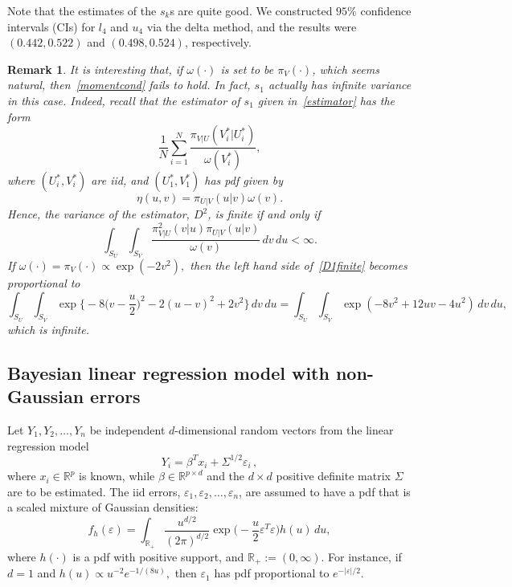 \documentclass[11pt]{article}
\newtheorem{remark}{Remark}
\begin{document}
         Note that the estimates of the $s_k$s are quite good.  We
         constructed $95\%$ confidence intervals (CIs) for $l_4$ and
         $u_4$ via the delta method, and the results were
         $(0.442,0.522)$ and $(0.498,0.524)$, respectively.

         \begin{remark} \label{gaussianomegapi} It is interesting
           that, if $\omega(\cdot)$ is set to be $\pi_V(\cdot)$, which
           seems natural, then~\eqref{momentcond} fails to hold.  In
           fact, $s_1$ actually has infinite variance in this case.
           Indeed, recall that the estimator of $s_1$ given
           in~\eqref{estimator} has the form
		\[
		\frac{1}{N} \sum_{i=1}^{N}
                \frac{\pi_{V|U}(V^*_i|U^*_i)}{\omega(V^*_i)},
		\]
		where $(U^*_i,V^*_i)$ are iid, and $(U^*_1,V^*_1)$ has pdf given by
		\[
		\eta(u,v) = \pi_{U|V}(u|v)\omega(v).
		\]
		Hence, the variance of the estimator, $D^2$, is finite
                if and only if
		\begin{equation} \label{D1finite}
		\int_{S_U} \int_{S_V} \frac{\pi_{V|U}^2(v|u)\pi_{U|V}(u|v)}{\omega(v)} \, dv\, du < \infty.
		\end{equation}
		If $\omega(\cdot) = \pi_V(\cdot) \propto \exp(-2v^2),$
                then the left hand side of~\eqref{D1finite} becomes
                proportional to
		\[
		\int_{S_U} \int_{S_V} \exp \Big\{ -8\Big( v-\frac{u}{2} \Big)^2 - 2(u-v)^2 + 2v^2 \Big\} \, dv\,du = \int_{S_U} \int_{S_V} \exp(-8v^2+12uv-4u^2) \, dv\,du,
		\]
		which is infinite.
	\end{remark}
	
	\subsection{Bayesian linear regression model with non-Gaussian
          errors}

	Let $Y_1,Y_2,\dots,Y_n$ be independent $d$-dimensional random
        vectors from the linear regression model
	\[
	Y_i = \beta^T x_i + \Sigma^{1/2}\varepsilon_i \,,
	\]
	where $x_i \in \mathbb{R}^{p}$ is known, while $\beta \in
        \mathbb{R}^{p \times d}$ and the $d\times d$ positive definite
        matrix $\Sigma$ are to be estimated.  The iid errors,
        $\varepsilon_1,\varepsilon_2,\dots,\varepsilon_n$, are assumed
        to have a pdf that is a scaled mixture of Gaussian densities:
	\[
	f_h(\varepsilon) = \int_{\mathbb{R}_+} \frac{u^{d/2}}{(2\pi)^{d/2}} \exp \Big( -\frac{u}{2} \varepsilon^T\varepsilon \Big) h(u) \, du,
	\]
	where $h(\cdot)$ is a pdf with positive support, and
        $\mathbb{R}_+ := (0,\infty).$ For instance, if $d=1$ and $h(u)
        \propto u^{-2}e^{-1/(8u)},$ then $\varepsilon_1$ has pdf
        proportional to $e^{-|\varepsilon|/2}.$
	
\end{document}
